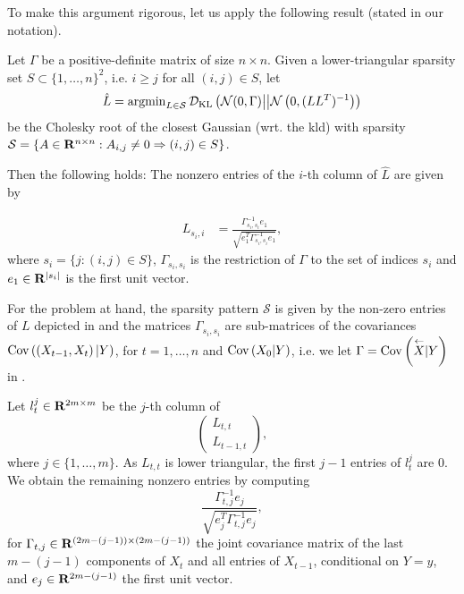 To make this argument rigorous, let us apply the following result (stated in our notation).
\begin{theorem}
    \label{thm:schafer_cholesky_analytical}
    Let $\Gamma$ be a positive-definite matrix of size $n\times n$. Given a lower-triangular sparsity set $S \subset \{1, \dots, n\}^{2}$, i.e. $i \geq j$ for all $(i,j) \in S$, let 
    $$
    \hat L = \operatorname{argmin}_{L \in \mathcal S} \mathcal D_{\text{KL}} \left(\mathcal N (0, \Gamma) \middle|\middle| \mathcal N \left( 0, (LL^{T})^{-1} \right)\right)
    $$
    be the Cholesky root of the closest Gaussian (wrt. the \gls{kld}) with sparsity $\mathcal S = \{A \in \mathbf R^{n \times n}: A_{i,j} \neq 0 \Rightarrow (i,j) \in S\}$. 

    Then the following holds:
    The nonzero entries of the $i$-th column of $\hat L$ are given by 
    
    \begin{align}
    \label{eq:schafer_gamma}
        L_{s_{i}, i} &= \frac{\Gamma_{s_{i}, s_{i}}^{-1} e_{1}}{\sqrt{e_{1}^{T}\Gamma_{s_{i}, s_{i}}^{-1} e_{1}}},
    \end{align}
    where $s_{i} = \{j : (i,j) \in S\}$, $\Gamma_{s_{i}, s_{i}}$ is the restriction of $\Gamma$ to the set of indices $s_{i}$ and $e_{1} \in\mathbf R^{\lvert s_{i}\rvert}$ is the first unit vector.
\end{theorem}
For the problem at hand, the sparsity pattern $\mathcal S $ is given by the non-zero entries of $L$ depicted in  and the matrices $\Gamma_{s_{i}, s_{i}}$ are sub-matrices of the covariances $\operatorname{Cov} \left( \left(X_{t-1}, X_{t}\right) | Y\right)$, for $t = 1, \dots, n$ and $\operatorname{Cov} \left( X_{0} | Y\right)$, i.e. we let $\Gamma = \operatorname{Cov} \left(\overset{\leftarrow}X| Y\right)$ in .

Let $l^{j}_{t}\in \mathbf R^{2m\times m}$ be the $j$-th column of 
$$
\begin{pmatrix}
    L_{t,t} \\
    L_{t - 1, t}
\end{pmatrix},
$$
where $j \in \{1, \dots, m\}$. 
As $L_{t,t}$ is lower triangular, the first $j - 1$ entries of $l^{j}_t$ are $0$. We obtain the remaining nonzero entries by computing
$$
\frac{\Gamma_{t,j}^{-1}e_{j}}{\sqrt{e_{j}^T\Gamma_{t,j}^{-1}e_{j}}},
$$
for $\Gamma_{t,j}\in \mathbf R^{(2m - (j - 1))\times (2m - (j - 1))}$ the joint covariance matrix of the last $ m - (j - 1)$ components of $X_{t}$ and all entries of $X_{t - 1}$, conditional on $Y = y$, and $e_{j} \in \mathbf R^{2m - (j - 1)}$ the first unit vector.

